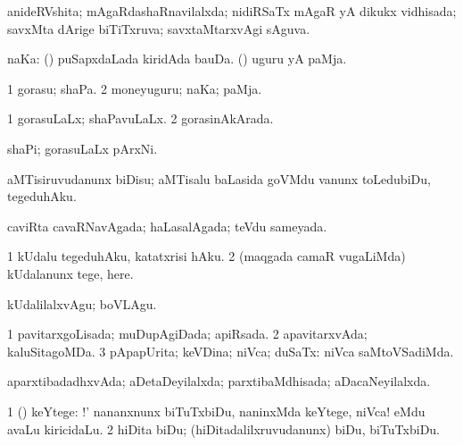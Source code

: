 \bentry
{} 
\gl{\gu}
\expl{}
\bmng
anideRVshita; mAgaRdashaRnavilalxda; nidiRSaTx mAgaR yA dikukx vidhisada; savxMta dArige biTiTxruva; savxtaMtarxvAgi sAguva. 
\emng
\eentry

\bentry
{} 
\gl{\nA}
\bmng
naKa: 
\banum
{} (\savi) puSapxdaLada kiridAda bauDa. 
 (\pArxvi) uguru yA paMja. 
\eanum
\emng
\eentry

\bentry
{} 
\gl{\nA}
\bmng
\bnum
\num{1} gorasu; shaPa. 
\num{2} moneyuguru; naKa; paMja. 
\enum
\emng
\eentry

\bentry
{} 
\gl{\gu}
\expl{}
\bmng
\bnum
\num{1} gorasuLaLx; shaPavuLaLx. 
\num{2} gorasinAkArada. 
\enum
\emng
\eentry

\bentry
{} 
\gl{\nA}
\expl{}
\bmng
shaPi; gorasuLaLx pArxNi. 
\emng
\eentry

\bentry
{} 
\gl{\akirx}
\expl{}
\bmng
aMTisiruvudanunx biDisu; aMTisalu baLasida goVMdu \mo vanunx toLedubiDu, tegeduhAku. 
\emng
\eentry

\bentry
{} 
\gl{\gu}
\expl{}
\bmng
caviRta cavaRNavAgada; haLasalAgada; teVdu sameyada. 
\emng
\eentry

\bentry
{} 
\gl{\sakirx}
\expl{}
\bmng
\bnum
\num{1} kUdalu tegeduhAku, katatxrisi hAku. 
\num{2} (maqgada camaR \mo vugaLiMda) kUdalanunx tege, here. 
\enum
\emng

\noindent
\gl{\akirx}
\expl{}
\bmng
kUdalilalxvAgu; boVLAgu. 
\emng
\eentry

\bentry
{} 
\gl{\gu}
\expl{}
\bmng
\bnum
\num{1} pavitarxgoLisada; muDupAgiDada; apiRsada. 
\num{2} apavitarxvAda; kaluSitagoMDa. 
\num{3} pApapUrita; keVDina; niVca; duSaTx:  niVca saMtoVSadiMda. 
\enum
\emng
\eentry

\bentry
{} 
\gl{\gu}
\expl{}
\bmng
aparxtibadadhxvAda; aDetaDeyilalxda; parxtibaMdhisada; aDacaNeyilalxda. 
\emng
\eentry

\bentry
{} 
\gl{\akirx}
\expl{}
\bmng
\bnum
\num{1} (\kAparx) keYtege: !'  nananxnunx biTuTxbiDu, naninxMda keYtege, niVca! eMdu avaLu kiricidaLu. 
\num{2} hiDita biDu; (hiDitadalilxruvudanunx) biDu, biTuTxbiDu. 
\enum
\emng
\eentry

